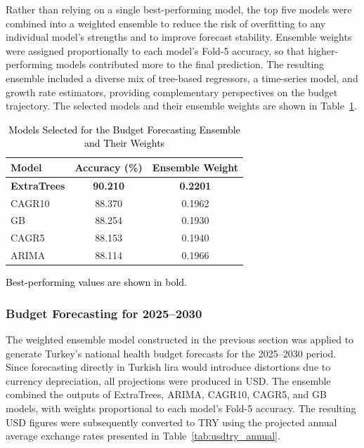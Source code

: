 \documentclass[final, 9pt, twocolumn]{saucis}
\newcommand{\rev}[1]{\textcolor{black}{#1}}
\begin{document}
Rather than relying on a single best-performing model, the top five models were combined into a weighted ensemble to reduce the risk of overfitting to any individual model's strengths and to improve forecast stability. Ensemble weights were assigned proportionally to each model's Fold-5 accuracy, so that higher-performing models contributed more to the final prediction. The resulting ensemble included a diverse mix of tree-based regressors, a time-series model, and growth rate estimators, providing complementary perspectives on the budget trajectory. The selected models and their ensemble weights are shown in Table~\ref{tab:budget_ensemble}.

\begin{table}[h]
\begin{threeparttable}
\centering
\caption{\rev{Models Selected for the Budget Forecasting Ensemble and Their Weights}}
\label{tab:budget_ensemble}
\begin{tabular}{lcc}
\hline
\textbf{Model} & \textbf{Accuracy (\%)} & \textbf{Ensemble Weight} \\
\hline
\textbf{ExtraTrees}       & \textbf{90.210} & \textbf{0.2201} \\
CAGR10           & 88.370 & 0.1962 \\
GB & 88.254 & 0.1930 \\
CAGR5            & 88.153 & 0.1940 \\
ARIMA            & 88.114 & 0.1966 \\
\hline
\end{tabular}
\begin{tablenotes}
\footnotesize
\item \rev{Best-performing values are shown in bold.}
\end{tablenotes}
\end{threeparttable}
\end{table}

\subsubsection{Budget Forecasting for 2025--2030}

The weighted ensemble model constructed in the previous section was applied to generate Turkey's national health budget forecasts for the 2025--2030 period. Since forecasting directly in Turkish lira would introduce distortions due to currency depreciation, all projections were produced in USD. The ensemble combined the outputs of ExtraTrees, ARIMA, CAGR10, CAGR5, and GB models, with weights proportional to each model's Fold-5 accuracy. The resulting USD figures were subsequently converted to TRY using the projected annual average exchange rates presented in Table~\ref{tab:usdtry_annual}.
\end{document}
